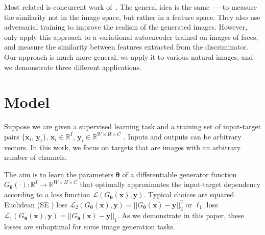 \documentclass{article}
\newcommand{\oR}{\mathbb{R}}
\newcommand{\inp}{\mathbf{x}}
\newcommand{\targ}{\mathbf{y}}
\newcommand{\weights}{\mathbf{\theta}}
\newcommand{\gen}{G_\weights}
\newcommand{\loss}{\mathcal{L}}
\newcommand{\ltwo}{SE }
\newcommand{\lone}{$\ell_1$ }
\newcommand{\imgspace}{\oR^{W \times H \times C}}
\newcommand{\inspace}{\oR^I}
\begin{document}
Most related is concurrent work of~\citet{Larsen_arxiv2015}.
The general idea is the same~--- to measure the similarity not in the image space, but rather in a feature space.
They also use adversarial training to improve the realism of the generated images.
However, \citet{Larsen_arxiv2015} only apply this approach to a variational autoencoder trained on images of faces, and measure the similarity between features extracted from the discriminator.
Our approach is much more general, we apply it to various natural images, and we demonstrate three different applications. 


\section{Model}
Suppose we are given a supervised learning task and a training set of input-target pairs $\{\inp_i,\, \targ_i\}$, $\inp_i \in \inspace$, $\targ_i \in \imgspace$ .
Inputs and outputs can be arbitrary vectors. In this work, we focus on targets that are images with an arbitrary number of channels. 

The aim is to learn the parameters $\weights$ of a differentiable generator function $\gen(\cdot) \colon \inspace \to \imgspace$ that optimally approximates the input-target dependency according to a loss function $\loss (\gen(\inp), \targ)$.
Typical choices are squared Euclidean (\ltwo\!\!) loss $\loss_2 (\gen(\inp), \targ) = || \gen(\inp) - \targ ||_2^2$ or \lone loss $\loss_1 (\gen(\inp),\targ) = ||\gen(\inp)-\targ||_1$.
As we demonstrate in this paper, these losses are suboptimal for some image generation tasks. 
\end{document}
